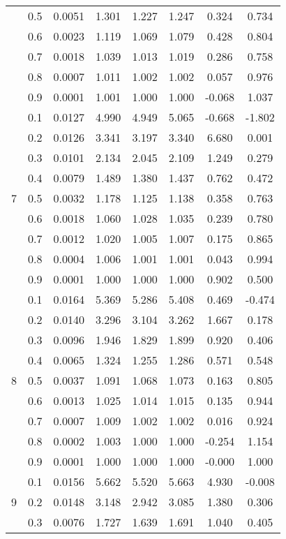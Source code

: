 \documentclass[11pt,a4paper]{report}
\begin{document}
\begin{longtable}{ | c | c || c | c | c | c | c | c | }
 & 0.5 & 0.0051 & 1.301 & 1.227 & 1.247 & 0.324 & 0.734 \\
 & 0.6 & 0.0023 & 1.119 & 1.069 & 1.079 & 0.428 & 0.804 \\
 & 0.7 & 0.0018 & 1.039 & 1.013 & 1.019 & 0.286 & 0.758 \\
 & 0.8 & 0.0007 & 1.011 & 1.002 & 1.002 & 0.057 & 0.976 \\
 & 0.9 & 0.0001 & 1.001 & 1.000 & 1.000 & -0.068 & 1.037 \\
 \hline
\multirow{9}{*}{7} & 0.1 & 0.0127 & 4.990 & 4.949 & 5.065 & -0.668 & -1.802 \\
 & 0.2 & 0.0126 & 3.341 & 3.197 & 3.340 & 6.680 & 0.001 \\
 & 0.3 & 0.0101 & 2.134 & 2.045 & 2.109 & 1.249 & 0.279 \\
 & 0.4 & 0.0079 & 1.489 & 1.380 & 1.437 & 0.762 & 0.472 \\
 & 0.5 & 0.0032 & 1.178 & 1.125 & 1.138 & 0.358 & 0.763 \\
 & 0.6 & 0.0018 & 1.060 & 1.028 & 1.035 & 0.239 & 0.780 \\
 & 0.7 & 0.0012 & 1.020 & 1.005 & 1.007 & 0.175 & 0.865 \\
 & 0.8 & 0.0004 & 1.006 & 1.001 & 1.001 & 0.043 & 0.994 \\
 & 0.9 & 0.0001 & 1.000 & 1.000 & 1.000 & 0.902 & 0.500 \\
 \hline
\multirow{9}{*}{8} & 0.1 & 0.0164 & 5.369 & 5.286 & 5.408 & 0.469 & -0.474 \\
 & 0.2 & 0.0140 & 3.296 & 3.104 & 3.262 & 1.667 & 0.178 \\
 & 0.3 & 0.0096 & 1.946 & 1.829 & 1.899 & 0.920 & 0.406 \\
 & 0.4 & 0.0065 & 1.324 & 1.255 & 1.286 & 0.571 & 0.548 \\
 & 0.5 & 0.0037 & 1.091 & 1.068 & 1.073 & 0.163 & 0.805 \\
 & 0.6 & 0.0013 & 1.025 & 1.014 & 1.015 & 0.135 & 0.944 \\
 & 0.7 & 0.0007 & 1.009 & 1.002 & 1.002 & 0.016 & 0.924 \\
 & 0.8 & 0.0002 & 1.003 & 1.000 & 1.000 & -0.254 & 1.154 \\
 & 0.9 & 0.0001 & 1.000 & 1.000 & 1.000 & -0.000 & 1.000 \\
 \hline
\multirow{9}{*}{9} & 0.1 & 0.0156 & 5.662 & 5.520 & 5.663 & 4.930 & -0.008 \\
 & 0.2 & 0.0148 & 3.148 & 2.942 & 3.085 & 1.380 & 0.306 \\
 & 0.3 & 0.0076 & 1.727 & 1.639 & 1.691 & 1.040 & 0.405 \\

\end{longtable}
\end{document}
